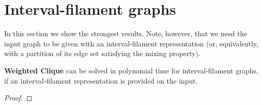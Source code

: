 \section{Interval-filament graphs}

In this section we show the strongest results. Note, however, that we need the input graph to be given with an interval-filament representation (or, equivalently, with a partition of its edge set satisfying the mixing property).

\begin{thm}
	\textbf{Weighted Clique} can be solved in polynomial time for interval-filament graphs, if an interval-filament representation is provided on the input.
\end{thm}

\begin{proof}
	
\end{proof}